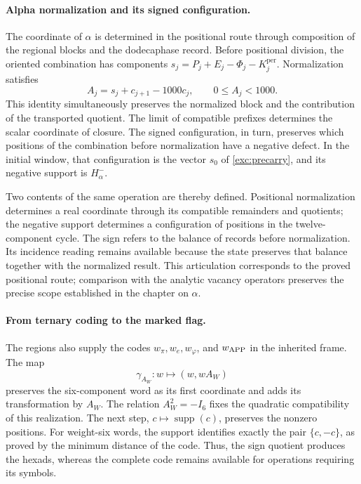 \paragraph{Alpha normalization and its signed configuration.}
\label{inc-ampl-clausura}
The coordinate of $\alpha$ is determined in the positional route through
composition of the regional blocks and the dodecaphase record. Before
positional division, the oriented combination has components
$s_j=P_j+E_j-\Phi_j-K_j^{\mathrm{per}}$. Normalization satisfies
\begin{equation}
 A_j=s_j+c_{j+1}-1000c_j,\qquad 0\leq A_j<1000.
 \label{inc-ampl-normalizacion}
\end{equation}
This identity simultaneously preserves the normalized block and the
contribution of the transported quotient. The limit of compatible
prefixes determines the scalar coordinate of closure. The
signed configuration, in turn, preserves which positions of the
combination before normalization have a negative defect.
In the initial window, that configuration is the vector $s_0$ of
\eqref{exc:precarry}, and its negative support is $H^-_\alpha$.

Two contents of the same operation are thereby defined. Positional
normalization determines a real coordinate through its compatible
remainders and quotients; the negative support determines a
configuration of positions in the twelve-component cycle. The sign
refers to the balance of records before normalization. Its incidence
reading remains available because the state preserves that balance
together with the normalized result. This articulation corresponds to the
proved positional route; comparison with the analytic vacancy
operators preserves the precise scope established in the chapter on
$\alpha$.

\paragraph{From ternary coding to the marked flag.}
\label{inc-ampl-bandera}
The regions also supply the codes $w_\pi,w_e,w_\varphi$, and
$w_{\rm APP}$ in the inherited frame. The map
\[
 \gamma_{A_W}:w\longmapsto(w,wA_W)
\]
preserves the six-component word as its first coordinate and adds
its transformation by $A_W$. The relation $A_W^2=-I_6$ fixes the
quadratic compatibility of this realization. The next step,
$c\mapsto\operatorname{supp}(c)$, preserves the nonzero positions.
For weight-six words, the support identifies exactly the pair
$\{c,-c\}$, as proved by the minimum distance of the code. Thus,
the sign quotient produces the hexads, whereas the complete code
remains available for operations requiring its symbols.

